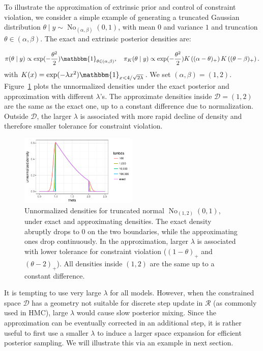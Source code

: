 \documentclass[10pt]{article}
\newcommand{\mc}[1]{\mathcal{#1}}
\DeclareMathOperator{\No}{No}
\begin{document}
To illustrate the approximation of extrinsic prior and control of constraint violation, we consider a simple example of generating a truncated Gaussian distribution $\theta \mid y \sim \No_{(\alpha,\beta)}(0,1)$, with mean $0$ and variance $1$ and truncation $\theta\in (\alpha,\beta)$. The exact and extrinsic posterior densities are:

$$\pi(\theta\mid y)\propto \exp(-\frac{\theta^2}{2}) \mathbbm{1}_{\theta\in(\alpha,\beta)}, \quad \pi_K(\theta\mid y)\propto \exp(-\frac{\theta^2}{2}) K \left ( (\alpha - \theta)_+ \right) K \left ( ( \theta - \beta)_+ \right).$$
with $K(x)= \exp( - \lambda x^2)\mathbbm{1}_{x<4/\sqrt{2\lambda}}$. We set $(\alpha, \beta)=(1,2)$. Figure~\ref{truncated_normal} plots the unnormalized densities under the exact posterior and approximation with different $\lambda$'s. The approximate densities inside $\mc D = (1,2)$ are the same as the exact one, up to a constant difference due to normalization. Outside $\mc D$, the larger $\lambda$ is associated with more rapid decline of density and therefore smaller tolerance for constraint violation.

\begin{figure}[H]
 \centering
 \includegraphics[width=0.5\textwidth]{density_truncated_normal}
\caption{Unnormalized densities for truncated normal $\No_{(1,2)}(0,1)$, under exact and approximating densities. The exact density abruptly drops to $0$ on the two boundaries, while the approximating ones drop continuously. In the approximation, larger $\lambda$ is associated with lower tolerance for constraint violation ($( 1-\theta )_+$ and $( \theta - 2)_+$). All densities inside $(1,2)$ are the same up to a constant difference.}
\label{truncated_normal}
\end{figure}

It is tempting to use very large $\lambda$ for all models. However, when the constrained space $\mc D$ has a geometry not suitable for discrete step update in $\mc R$ (as commonly used in HMC), large $\lambda$ would cause slow posterior mixing. Since the approximation can be eventually corrected in an additional step, it is rather useful to first use a smaller $\lambda$ to induce a larger space expansion for efficient posterior sampling. We will illustrate this via an example in next section.
\end{document}
